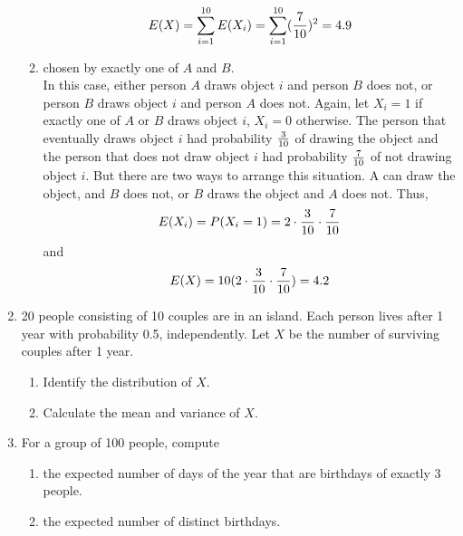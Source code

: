 \documentclass[12pt]{article}%
\newcommand{\0}{{\bf 0}}
\begin{document}
\begin{enumerate}
\begin{enumerate}
$$E(X)=\sum_{i=1}^{10} E(X_i)=\sum_{i=1}^{10} (\frac{7}{10})^2 =4.9$$




\item chosen by exactly one of $A$ and $B$.
\\
{\color{blue}{\bf Sol.}}
In this case, either person $A$ draws object $i$ and person $B$ does not, or person $B$ draws object $i$ and person $A$ does not. Again, let $X_i = 1$ if exactly one of $A$ or $B$ draws object $i$, $X_i = 0$ otherwise. The person that eventually draws object $i$ had probability $\frac{3}{10}$ of
 drawing the object and the person that does not draw object $i$ had probability $\frac{7}
 {10}$ of not drawing object $i$. But there are two ways to arrange this situation. A can draw the
 object, and $B$ does not, or $B$ draws the object and $A$ does not. Thus,
$$E(X_i)=P(X_i=1)=2 \cdot \frac{3}{10} \cdot \frac{7}{10}$$
and
$$E(X)=10(2\cdot\frac{3}{10}\cdot \frac{7}{10})=4.2$$




\end{enumerate}
 
 
 
 
 
 \item
20 people consisting of 10 couples are in an island.
Each person lives after 1 year with probability 0.5, independently.
Let $X$ be the number of surviving couples after 1 year. 
\begin{enumerate}
\item
Identify the distribution of $X$. 



\item
Calculate the mean and variance of $X$. 



\end{enumerate}







\item
For a group of 100 people, compute
\begin{enumerate}
\item the expected number of days of the year that
are birthdays of exactly 3 people.




\item the expected number of distinct birthdays.




\end{enumerate}
 

\end{enumerate}
\end{document}
